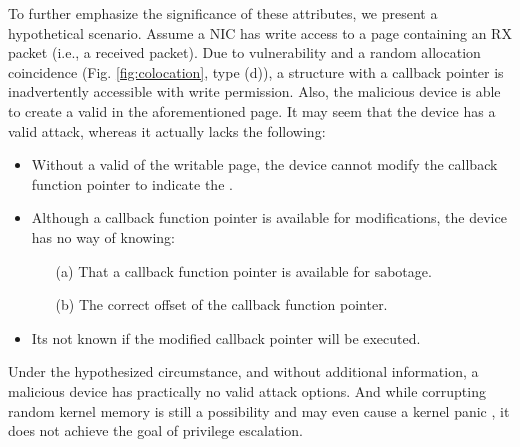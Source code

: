 To further emphasize the significance of these attributes, we present a hypothetical scenario. Assume a NIC has write access to a page containing an RX packet (i.e., a received packet). Due to \subpage{} vulnerability and a random allocation coincidence (Fig. \ref{fig:colocation}, type (d)), a structure with a callback pointer is inadvertently accessible with write permission. Also, the malicious device is able to create a valid \mabaf{} in the aforementioned page. It may seem that the device has a valid attack, whereas it actually lacks the following:

\begin{itemize}
    \item Without a valid \kva{} of the writable page, the device cannot modify the callback function pointer to indicate the \mabaf.
    \item Although a callback function pointer is available for modifications, the device has no way of knowing: 
    \begin{enumerate}
        \item[(a)] That a callback function pointer is available for sabotage.
        \item[(b)] The correct offset of the callback function pointer.
    \end{enumerate}
    \item Its not known if the modified callback pointer will be executed.
\end{itemize}

Under the hypothesized circumstance, and without additional information, a malicious device has practically no valid attack options. 
And while corrupting random kernel memory is still a possibility and may even cause a kernel panic \cite{MMT16}, it does not achieve the goal of privilege escalation.




